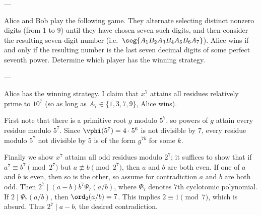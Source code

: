 
---

Alice and Bob play the following game. They alternate selecting distinct nonzero digits (from $1$ to $9$) until they have chosen seven such digits, and then consider the resulting seven-digit number (i.e.\ $\seg{A_1B_2A_3B_4A_5B_6A_7}$). Alice wins if and only if the resulting number is the last seven decimal digits of some perfect seventh power. Determine which player has the winning strategy.

---

Alice has the winning strategy. I claim that $x^7$ attains all residues relatively prime to $10^7$ (so as long as $A_7\in\{1,3,7,9\}$, Alice wins).

First note that there is a primitive root $g$ modulo $5^7$, so powers of $g$ attain every residue modulo $5^7$. Since $\vphi(5^7)=4\cdot5^6$ is not divisible by $7$, every residue modulo $5^7$ not divisible by $5$ is of the form $g^{7k}$ for some $k$.

Finally we show $x^7$ attains all odd residues modulo $2^7$; it suffices to show that if $a^7\equiv b^7\pmod{2^7}$ but $a\not\equiv b\pmod{2^7}$, then $a$ and $b$ are both even. If one of $a$ and $b$ is even, then so is the other, so assume for contradiction $a$ and $b$ are both odd. Then $2^7\mid(a-b)b^7\Psi_7(a/b)$, where $\Psi_7$ denotes $7$th cyclotomic polynomial. If $2\mid\Psi_7(a/b)$, then $\ord_2(a/b)=7$. This implies $2\equiv1\pmod7$, which is absurd. Thus $2^7\mid a-b$, the desired contradiction.

